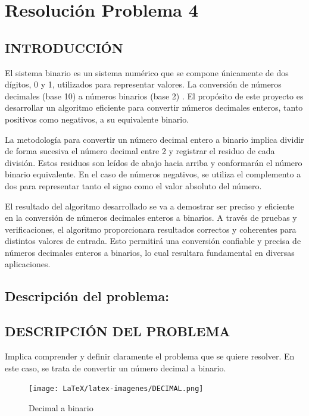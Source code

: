 \section{Resolución Problema 4}

\subsection{\textbf{INTRODUCCIÓN} } 

El sistema binario es un sistema numérico que se compone únicamente de dos dígitos, 0 y 1, utilizados para representar valores. La conversión de números decimales (base 10) a números binarios (base 2) . El propósito de este proyecto es desarrollar un algoritmo eficiente para convertir números decimales enteros, tanto positivos como negativos, a su equivalente binario.

La metodología para convertir un número decimal entero a binario implica dividir de forma sucesiva el número decimal entre 2 y registrar el residuo de cada división. Estos residuos son  leídos de abajo hacia arriba y conformarán el número binario equivalente. En el caso de números negativos, se utiliza el complemento a dos para representar tanto el signo como el valor absoluto del número.


El resultado del  algoritmo desarrollado se va a demostrar ser  preciso y eficiente en la conversión de números decimales enteros a binarios. A través de pruebas y verificaciones, el algoritmo proporcionara resultados correctos y coherentes para distintos valores de entrada. Esto permitirá una conversión confiable y precisa de números decimales enteros a binarios, lo cual resultara fundamental en diversas aplicaciones.


\subsection{\textbf{Descripción del problema:}}

\subsection{\textbf{DESCRIPCIÓN DEL PROBLEMA} } 
Implica comprender y definir claramente el problema que se quiere resolver. En este caso, se trata de convertir un número decimal a binario.


\begin{figure}[h!]
    \centering
    \texttt{[image: LaTeX/latex-imagenes/DECIMAL.png]}
    \caption{Decimal a binario}
    \label{decimal a binario}
\end{figure}


